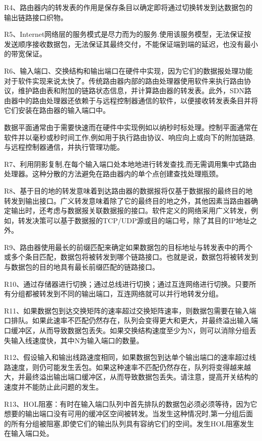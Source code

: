 \documentclass[11pt,UTF8,twoside]{article}
\begin{document}
	R4、路由器内的转发表的作用是保存条目以确定即将通过切换转发到达数据包的输出链路接口织物。
	
	R5、Internet网络层的服务模式是尽力而为的服务.使用该服务模型，无法保证按发送顺序接收数据包，无法保证其最终交付，不能保证端到端的延迟，也没有最小的带宽保证。
	
	R6、输入端口、交换结构和输出端口在硬件中实现，因为它们的数据报处理功能对于软件实现来说太快了。传统路由器内部的路由处理器使用软件来执行路由协议，维护路由表和附加的链路状态信息，并计算路由器的转发表。此外，SDN路由器中的路由处理器还依赖于与远程控制器通信的软件，以便接收转发表条目并将它们安装在路由器的输入端口中。
	
	数据平面通常由于需要快速而在硬件中实现例如以纳秒时标处理。控制平面通常在软件并以毫秒或秒时间工作,例如用于执行路由协议、响应向上或向下的附加链路,与远程控制器通信，并执行管理功能。
	
	R7、利用阴影复制,在每个输入端口处本地地进行转发查找,而无需调用集中式路由处理器。这种分散的方法避免在路由器内的单个点创建查找处理瓶颈。
	
	R8、基于目的地的转发意味着到达路由器的数据报将仅基于数据报的最终目的地转发到输出接口。广义转发意味着除了它的最终目的地之外，其他因素当路由器确定输出时，还考虑与数据报关联数据报的接口。软件定义的网络采用广义转发，例如，转发决策可以基于数据报的TCP/UDP源或目的端口号，除了其目的IP地址之外。
	
	R9、路由器使用最长的前缀匹配来确定如果数据包的目标地址与转发表中的两个或多个条目匹配，数据包将被转发到哪个链路接口。也就是说，数据包将被转发到与数据包的目的地具有最长前缀匹配的链路接口。
	
	R10、通过存储器进行切换；通过总线进行切换；通过互连网络进行切换。只要所有分组都被转发到不同的输出端口，互连网络就可以并行地转发分组。
	
	R11、如果数据包到达交换矩阵的速率超过交换矩阵速率，则数据包需要在输入端口排队。如果此速率不匹配仍然存在，队列会变得更大和更大，并最终溢出输入端口缓冲区，从而导致数据包丢失。如果交换结构速度至少为N，则可以消除分组丢失输入线速度快，其中N为输入端口的数量。
	
	R12、假设输入和输出线路速度相同，如果数据包到达单个输出端口的速率超过线路速度，则仍可能发生丢包。如果这种速率不匹配仍然存在，队列将变得越来越大，并最终溢出输出端口缓冲区，从而导致数据包丢失。请注意，提高开关结构的速度并不能防止此问题的发生。
	
	R13、HOL阻塞：有时在输入端口队列中首先排队的数据包必须必须等待，因为它想要的输出端口没有可用的缓冲区空间被转发。当发生这种情况时,第一分组后面的所有分组被阻塞,即使它们的输出队列具有容纳它们的空间。发生HOL阻塞发生在输入端口处。
	
\end{document}
